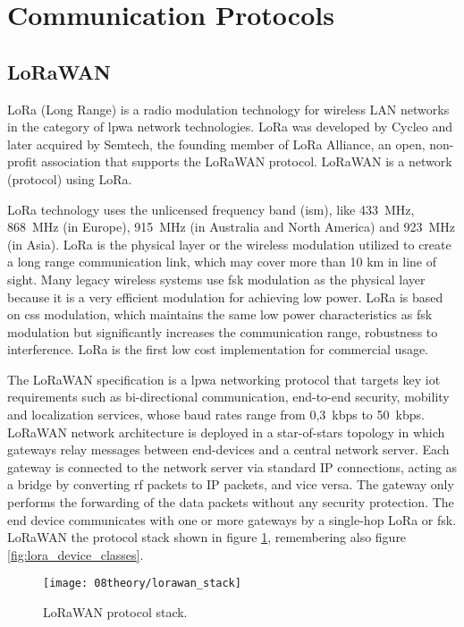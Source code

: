 \section{Communication Protocols}
\clearpage
\subsection{LoRaWAN}
LoRa (Long Range) is a radio modulation technology for wireless LAN networks in the category of \ac{lpwa} network technologies. LoRa was developed by Cycleo and later acquired by Semtech, the founding member of LoRa Alliance, an open, non-profit association that supports the LoRaWAN protocol. LoRaWAN is a network (protocol) using LoRa. \cite{lora_alliance}

LoRa technology uses the unlicensed frequency band (\ac{ism}), like 433~MHz, 868~MHz (in Europe), 915~MHz (in Australia and North America) and 923~MHz (in Asia). LoRa is the physical layer or the wireless modulation utilized to create a long range communication link, which may cover more than 10 km in line of sight. Many legacy wireless systems use \ac{fsk} modulation as the physical layer because it is a very efficient modulation for achieving low power. LoRa is based on \ac{css} modulation, which maintains the same low power characteristics as \ac{fsk} modulation but significantly increases the communication range, robustness to interference. LoRa is the first low cost implementation for commercial usage.

The LoRaWAN specification is a \ac{lpwa} networking protocol that targets key \ac{iot} requirements such as bi-directional communication, end-to-end security, mobility and localization services, whose baud rates range from 0,3~kbps to 50~kbps. LoRaWAN network architecture is deployed in a star-of-stars topology in which gateways relay messages between end-devices and a central network server. Each gateway is connected to the network server via standard IP connections, acting as a bridge by converting \ac{rf} packets to IP packets, and vice versa. The gateway only performs the forwarding of the data packets without any security protection. The end device communicates with one or more gateways by a single-hop LoRa or \ac{fsk}. LoRaWAN the protocol stack shown in figure \ref{fig:lorawan_stack}, remembering also figure \ref{fig:lora_device_classes}. \cite{what_is_lorawan}

\begin{figure}[H]
	\centering
	\texttt{[image: 08theory/lorawan\_stack]}
	\caption{LoRaWAN protocol stack.}
	\label{fig:lorawan_stack}
\end{figure}

